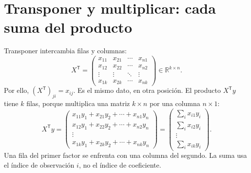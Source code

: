 \documentclass[11pt,a4paper]{article}
\newcommand{\R}{\mathbb R}
\newcommand{\T}{^{\mathsf T}}
\begin{document}
\section{Transponer y multiplicar: cada suma del producto}\label{logit8}
Transponer intercambia filas y columnas:
\[
X\T=\begin{pmatrix}
x_{11}&x_{21}&\cdots&x_{n1}\\
x_{12}&x_{22}&\cdots&x_{n2}\\
\vdots&\vdots&\ddots&\vdots\\
x_{1k}&x_{2k}&\cdots&x_{nk}
\end{pmatrix}\in\R^{k\times n}.
\]
Por ello, $(X\T)_{ji}=x_{ij}$. Es el mismo dato, en otra posición.
El producto $X\T y$ tiene $k$ filas, porque multiplica una matriz
$k\times n$ por una columna $n\times1$:
\[
X\T y=
\begin{pmatrix}
x_{11}y_1+x_{21}y_2+\cdots+x_{n1}y_n\\
x_{12}y_1+x_{22}y_2+\cdots+x_{n2}y_n\\
\vdots\\x_{1k}y_1+x_{2k}y_2+\cdots+x_{nk}y_n
\end{pmatrix}
=\begin{pmatrix}\sum_i x_{i1}y_i\\\sum_i x_{i2}y_i\\
\vdots\\\sum_i x_{ik}y_i\end{pmatrix}.
\]
Una fila del primer factor se enfrenta con una columna del segundo.
La suma usa el índice de observación $i$, no el índice de coeficiente.
\end{document}
